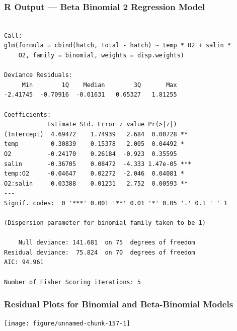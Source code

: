 \documentclass[oneside]{book}\usepackage[]{graphicx}\usepackage[svgnames]{xcolor}
\makeatletter
\newenvironment{kframe}{%
 \def\at@end@of@kframe{}%
 \ifinner\ifhmode%
  \def\at@end@of@kframe{\end{minipage}}%
  \begin{minipage}{\columnwidth}%
 \fi\fi%
 \def\FrameCommand##1{\hskip\@totalleftmargin \hskip-\fboxsep
 \colorbox{shadecolor}{##1}\hskip-\fboxsep
     \hskip-\linewidth \hskip-\@totalleftmargin \hskip\columnwidth}%
 \MakeFramed {\advance\hsize-\width
   \@totalleftmargin\z@ \linewidth\hsize
   \@setminipage}}%
 {\par\unskip\endMakeFramed%
 \at@end@of@kframe}
\newenvironment{knitrout}{}{} %
\makeatother
\begin{document}
\subsubsection*{R Output --- Beta Binomial 2 Regression Model}
\begin{knitrout}
\color{fgcolor}\begin{kframe}
\begin{verbatim}

Call:
glm(formula = cbind(hatch, total - hatch) ~ temp * O2 + salin * 
    O2, family = binomial, weights = disp.weights)

Deviance Residuals: 
     Min        1Q    Median        3Q       Max  
-2.41745  -0.70916  -0.01631   0.65327   1.81255  

Coefficients:
            Estimate Std. Error z value Pr(>|z|)    
(Intercept)  4.69472    1.74939   2.684  0.00728 ** 
temp         0.30839    0.15378   2.005  0.04492 *  
O2          -0.24170    0.26184  -0.923  0.35595    
salin       -0.36705    0.08472  -4.333 1.47e-05 ***
temp:O2     -0.04647    0.02272  -2.046  0.04081 *  
O2:salin     0.03388    0.01231   2.752  0.00593 ** 
---
Signif. codes:  0 '***' 0.001 '**' 0.01 '*' 0.05 '.' 0.1 ' ' 1

(Dispersion parameter for binomial family taken to be 1)

    Null deviance: 141.681  on 75  degrees of freedom
Residual deviance:  75.824  on 70  degrees of freedom
AIC: 94.961

Number of Fisher Scoring iterations: 5
\end{verbatim}
\end{kframe}
\end{knitrout}
\subsubsection*{Residual Plots for Binomial and Beta-Binomial Models}
\begin{knitrout}
\color{fgcolor}

{\centering \texttt{[image: figure/unnamed-chunk-157-1]} 

}


\end{knitrout}
\end{document}

